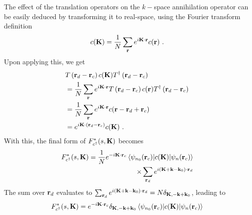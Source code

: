 \documentclass[reprint,hidelinks]{revtex4-2}
\begin{document}
The effect of the translation operators on the \(k-\)space annihilation operator can be easily deduced by transforming it to real-space, using the Fourier transform definition
\begin{equation}\begin{aligned}\label{fourTransf}
	c({\bf K}) = \frac{1}{N}\sum_{\bf r}e^{i{\bf K}\cdot{\bf r}}c({\bf r})~.
\end{aligned}\end{equation}
Upon applying this, we get
\begin{equation}\begin{aligned}\label{translationOnField}
	&T\left({\bf r}_d - {\bf r}_c\right) c({\bf K}) T^\dagger\left({\bf r}_d - {\bf r}_c\right)\\
	&= \frac{1}{N}\sum_{\bf r}e^{i{\bf K}\cdot{\bf r}}T\left({\bf r}_d - {\bf r}_c\right) c({\bf r}) T^\dagger\left({\bf r}_d - {\bf r}_c\right)\\
	&= \frac{1}{N}\sum_{\bf r}e^{i{\bf K}\cdot{\bf r}}c({\bf r} - {\bf r}_d + {\bf r}_c)\\
	&= e^{i{\bf K}\cdot\left({\bf r}_d - {\bf r}_c\right)}c({\bf K})~.
\end{aligned}\end{equation}
With this, the final form of \(F_{c^\dagger}^*(s, {\bf K})\) becomes
\begin{equation}\begin{aligned}
	F_{c^\dagger}^*(s, {\bf K}) = \frac{1}{N}e^{-i {\bf K}\cdot{\bf r}_c}\braket{\psi_{n_0}({\bf r}_c)|c({\bf K})|\psi_{n}({\bf r}_c)}\\
	\times\sum_{{\bf r}_d}e^{i \left({\bf K} + {\bf k} - {\bf k}_0\right)\cdot{\bf r}_d}
\end{aligned}\end{equation}
The sum over \({\bf r}_d\) evaluates to \(\sum_{{\bf r}_d}e^{i \left({\bf K} + {\bf k} - {\bf k}_0\right)\cdot{\bf r}_d} = N \delta_{{\bf K}, - {\bf k} + {\bf k}_0}\), leading to
\begin{equation}\begin{aligned}
	F_{c^\dagger}^*(s, {\bf K}) = e^{-i {\bf K}\cdot{\bf r}_c}\delta_{{\bf K}, - {\bf k} + {\bf k}_0}\braket{\psi_{n_0}({\bf r}_c)|c({\bf K})|\psi_{n}({\bf r}_c)}
\end{aligned}\end{equation}
\end{document}
